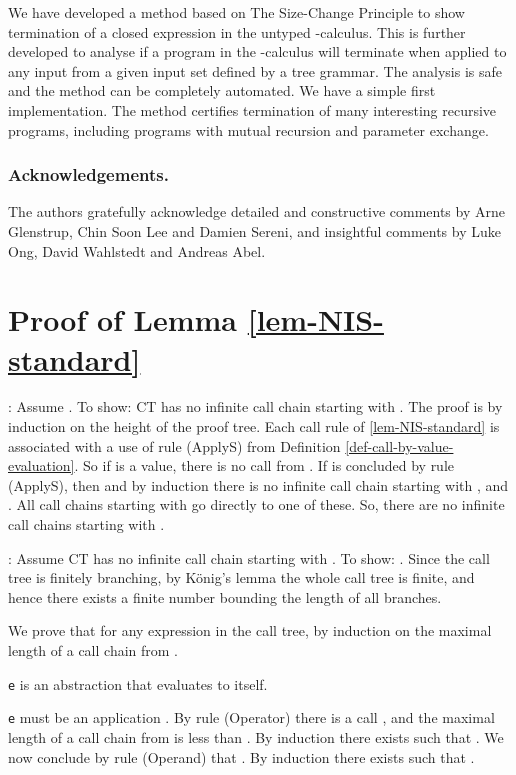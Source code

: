 \documentclass{LMCS}
\newcommand{\bprf}{\proof}
\theoremstyle{definition}\newtheorem{env}[thm]{Environment}
\begin{document}
We have developed a method based on The Size-Change Principle to show termination of a closed expression in the untyped -calculus. This is further developed to analyse if a program in the -calculus will terminate when applied to any input from a given input set defined by a tree grammar. The analysis is safe and the method can be  completely automated. We have a simple first implementation. The method certifies termination of many interesting recursive programs, including programs with mutual recursion and parameter exchange.

\subsubsection*{Acknowledgements.} The authors gratefully acknowledge 
detailed and constructive comments by Arne Glenstrup, Chin Soon 
Lee and Damien Sereni, and insightful comments by Luke Ong, David Wahlstedt and Andreas Abel.
\appendix


\section{Proof of Lemma \ref{lem-NIS-standard}}

\bprf 
: Assume . To show: CT has no infinite call chain starting with . 
The proof is by induction on the height of the proof tree. Each call rule of  \ref{lem-NIS-standard} is associated 
with a use of rule (ApplyS) from Definition 
\ref{def-call-by-value-evaluation}. So if  is a value, there is no call from . If  is concluded by rule (ApplyS), then  and  by induction there is no infinite call chain starting with ,  and . All call chains starting with  go  directly to one of these. So, there are no infinite call chains starting with .


 : Assume CT has no infinite call chain starting with . To show: .  
Since the call tree is finitely branching,
 by K\"{o}nig's lemma the whole call tree is finite, and 
 hence there exists a finite number  bounding the length of all branches.

We prove  that   for any expression in the call tree, by induction on the maximal length  of a call chain from 
. 

 {\tt e} is an abstraction that evaluates to itself.

 {\tt e} must be an application .
By rule (Operator) 
there is a call 
, 
and the maximal length of 
a call chain from  is less than . 
By induction there exists 
 such that . 
We  now  conclude by rule (Operand) 
that
. By induction
there exists  such that . 
\end{document}
